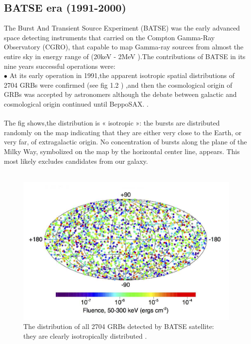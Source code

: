 \subsection{BATSE era (1991-2000)}
The Burst And Transient Source Experiment (BATSE) was the early advanced space detecting instruments that carried on the Compton Gamma-Ray Observatory (CGRO), that capable to map Gamma-ray sources from almost the entire sky in energy range of (20keV - 2MeV ).The contributions of BATSE in its nine years successful operations were:\\
$\bullet$ At its early operation in 1991,the apparent isotropic spatial distributions of 2704 GRBs were confirmed (see fig 1.2 ) ,and then the cosmological origin of GRBs was accepted by astronomers although the debate between galactic and cosmological origin continued until BeppoSAX. \citep{5}\citep{7}.\\\\
The fig shows,the  distribution is « isotropic »: the bursts are distributed randomly on the map indicating that they are either very close to the Earth, or very far, of extragalactic origin. No concentration of bursts along the plane of the Milky Way, symbolized on the map by the horizontal center line, appears. This most likely excludes candidates from our galaxy.\\\\
\begin{figure}[h]
\begin{center}
\includegraphics[scale=0.4]{Figures/fig2.png}
\caption{The distribution of all 2704 GRBs detected by BATSE satellite: they are clearly isotropically distributed \citep{7}. }
\end{center}
\end{figure}
